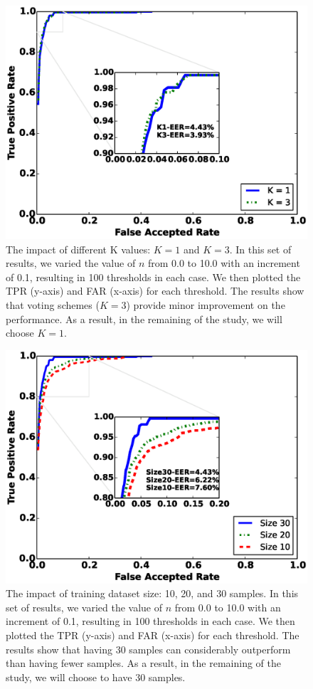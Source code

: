 \begin{figure}\centering
\includegraphics[width=.75\columnwidth]{figure/roc_k_value.eps}
\caption{\label{fig:roc_k_value} The impact of different K values: $K=1$ and $K=3$. In this set of results, we varied the value of $n$ from 0.0 to 10.0 with an increment of 0.1, resulting in 100 thresholds in each case. We then plotted the TPR (y-axis) and FAR (x-axis) for each threshold. The results show that voting schemes ($K=3$) provide minor improvement on the performance. As a result, in the remaining of the study, we will choose $K=1$.}
\end{figure}



\begin{figure}[t]
\centering
\includegraphics [width=.75\columnwidth]{figure/roc_diff_size.eps}
\caption{The impact of training dataset size: 10, 20, and 30 samples. In this set of results, we varied the value of $n$ from 0.0 to 10.0 with an increment of 0.1, resulting in 100 thresholds in each case. We then plotted the TPR (y-axis) and FAR (x-axis) for each threshold. The results show that having 30 samples can considerably outperform than having fewer samples. As a result, in the remaining of the study, we will choose to have 30 samples.}
\label{fig:roc_diff_size}
\end{figure}

